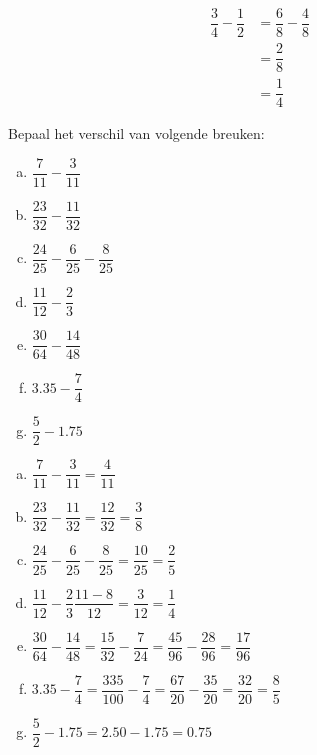 \documentclass[12pt]{article}
\begin{document}
\begin{voorbeeld}
\begin{align*}
  \dfrac{3}{4} - \dfrac{1}{2} &= \dfrac{6}{8} - \dfrac{4}{8}\\
                              &= \dfrac{2}{8}\\
                              &= \dfrac{1}{4}
\end{align*}
\end{voorbeeld}

\begin{exercise}
Bepaal het verschil van volgende breuken:
\begin{multicols}{2}
  \begin{enumerate}[(a)]
    \item $\dfrac{7}{11}-\dfrac{3}{11}$
    \item $\dfrac{23}{32}-\dfrac{11}{32}$
    \item $\dfrac{24}{25}-\dfrac{6}{25}-\dfrac{8}{25}$
    \item $\dfrac{11}{12}-\dfrac{2}{3}$
    \item $\dfrac{30}{64}-\dfrac{14}{48}$
    \item $3.35-\dfrac{7}{4}$
    \item $\dfrac{5}{2}-1.75$
  \end{enumerate}
\end{multicols}
\end{exercise}

\begin{solution}
  \begin{enumerate}[(a)]
    \item $\dfrac{7}{11}-\dfrac{3}{11}=\dfrac{4}{11}$
    \item $\dfrac{23}{32}-\dfrac{11}{32}=\dfrac{12}{32}=\dfrac{3}{8}$
    \item $\dfrac{24}{25}-\dfrac{6}{25}-\dfrac{8}{25}=\dfrac{10}{25}=\dfrac{2}{5}$
    \item $\dfrac{11}{12}-\dfrac{2}{3}\dfrac{11-8}{12}=\dfrac{3}{12}=\dfrac{1}{4}$
    \item $\dfrac{30}{64}-\dfrac{14}{48}=\dfrac{15}{32}-\dfrac{7}{24}=\dfrac{45}{96}-\dfrac{28}{96}=\dfrac{17}{96}$
    \item $3.35-\dfrac{7}{4}=\dfrac{335}{100}-\dfrac{7}{4}=\dfrac{67}{20}-\dfrac{35}{20}=\dfrac{32}{20}=\dfrac{8}{5}$
    \item $\dfrac{5}{2}-1.75=2.50-1.75=0.75$
  \end{enumerate}
\end{solution}
\end{document}
